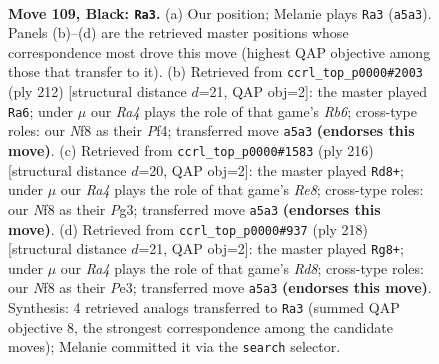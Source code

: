 \documentclass[11pt]{article}
\begin{document}
\clearpage

\begin{figure}[p]\centering
\begin{subfigure}{0.46\textwidth}\centering
\resizebox{\linewidth}{!}{%
\newchessgame
\chessboard[
  setfen={5n2/1R6/7p/r3p3/6kb/3p4/8/1K6 b - - 15 109},
  showmover=false,
  pgfstyle=straightmove, color=movearrow, markmove={a5-a3}
]}
\caption{}
\end{subfigure}\hfill
\begin{subfigure}{0.46\textwidth}\centering
\resizebox{\linewidth}{!}{%
\newchessgame
\chessboard[
  setfen={8/6k1/1R6/5p2/5P1K/4P3/6r1/8 w - - 91 107},
  showmover=false,
  pgfstyle=straightmove, color=movearrow, markmove={b6-a6}
]}
\caption{}
\end{subfigure}
\\[4pt]
\begin{subfigure}{0.46\textwidth}\centering
\resizebox{\linewidth}{!}{%
\newchessgame
\chessboard[
  setfen={4R3/8/8/8/r2k2p1/6P1/3K1P2/8 w - - 19 109},
  showmover=false,
  pgfstyle=straightmove, color=movearrow, markmove={e8-d8}
]}
\caption{}
\end{subfigure}\hfill
\begin{subfigure}{0.46\textwidth}\centering
\resizebox{\linewidth}{!}{%
\newchessgame
\chessboard[
  setfen={3R4/8/r5k1/6p1/6P1/4P3/4K3/8 w - - 85 110},
  showmover=false,
  pgfstyle=straightmove, color=movearrow, markmove={d8-g8}
]}
\caption{}
\end{subfigure}
\caption{\textbf{Move 109, Black: \texttt{Ra3}.} (a) Our position; Melanie plays \texttt{Ra3} (\texttt{a5a3}). Panels (b)--(d) are the retrieved master positions whose correspondence most drove this move (highest QAP objective among those that transfer to it). (b) Retrieved from \texttt{ccrl\_top\_p0000\#2003} (ply 212) [structural distance $d$=21, QAP obj=2]: the master played \texttt{Ra6}; under $\mu$ our \emph{Ra4} plays the role of that game's \emph{Rb6}; cross-type roles: our \emph{N}f8 as their \emph{P}f4; transferred move \texttt{a5a3} \textbf{(endorses this move)}. (c) Retrieved from \texttt{ccrl\_top\_p0000\#1583} (ply 216) [structural distance $d$=20, QAP obj=2]: the master played \texttt{Rd8+}; under $\mu$ our \emph{Ra4} plays the role of that game's \emph{Re8}; cross-type roles: our \emph{N}f8 as their \emph{P}g3; transferred move \texttt{a5a3} \textbf{(endorses this move)}. (d) Retrieved from \texttt{ccrl\_top\_p0000\#937} (ply 218) [structural distance $d$=21, QAP obj=2]: the master played \texttt{Rg8+}; under $\mu$ our \emph{Ra4} plays the role of that game's \emph{Rd8}; cross-type roles: our \emph{N}f8 as their \emph{P}e3; transferred move \texttt{a5a3} \textbf{(endorses this move)}. Synthesis: 4 retrieved analogs transferred to \texttt{Ra3} (summed QAP objective 8, the strongest correspondence among the candidate moves); Melanie committed it via the \texttt{search} selector.}
\label{fig:thought-m217}
\end{figure}
\end{document}
